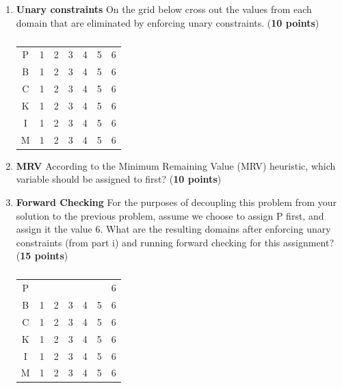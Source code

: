 \begin{enumerate}
  \item {\bf Unary constraints} On the grid below cross out the values from each domain that are eliminated by enforcing unary constraints. (\textbf{10 points})

  \begin{table}[h]
\centering
\caption{}
\begin{tabular}{ccccccc}
P & 1 & 2 & 3 & 4 & 5 & 6\\
B & 1 & 2 & 3 & 4 & 5 & 6\\
C & 1 & 2 & 3 & 4 & 5 & 6\\
K & 1 & 2 & 3 & 4 & 5 & 6\\
I & 1 & 2 & 3 & 4 & 5 & 6\\
M & 1 & 2 & 3 & 4 & 5 & 6\\
\end{tabular}
\end{table}

\vspace{2cm}


\item {\bf MRV}
According to the Minimum Remaining Value (MRV) heuristic, which variable should be assigned to first? (\textbf{10 points})

\newpage

\item {\bf Forward Checking}
For the purposes of decoupling this problem from your solution to the
previous problem, assume we choose to assign P first, and assign it the value 6. What are the resulting domains after enforcing unary constraints (from part i) and running forward checking for this assignment? (\textbf{15 points})

\begin{table}[h]
\centering
\caption{}
\begin{tabular}{ccccccc}
P &   &   &   &  &   &  6\\
B & 1 & 2 & 3 & 4 & 5 & 6\\
C & 1 & 2 & 3 & 4 & 5 & 6\\
K & 1 & 2 & 3 & 4 & 5 & 6\\
I & 1 & 2 & 3 & 4 & 5 & 6\\
M & 1 & 2 & 3 & 4 & 5 & 6\\
\end{tabular}
\end{table}

\vspace{1cm}



\end{enumerate}
